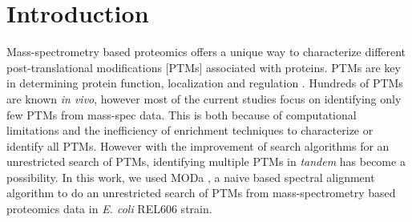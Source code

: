 \documentclass[12pt]{article}
\begin{document}

\section{Introduction}

Mass-spectrometry based proteomics \cite{Lamondetal2012} offers a unique way to characterize different post-translational modifications [PTMs] associated with proteins. PTMs are key in determining protein function, localization and regulation \cite{OlsenMann2013}. Hundreds of PTMs \cite{Garavellietal2001} \cite{CreasyCottrell2004} are known \emph{in vivo}, however most of the current studies focus on identifying only few PTMs from mass-spec data. This is both because of computational limitations and the inefficiency of enrichment techniques to characterize or identify all PTMs. However with the improvement of search algorithms for an unrestricted search of PTMs, identifying multiple PTMs in \emph{tandem} has become a possibility. In this work, we used MODa \cite{Naetal2012}, a naive based spectral alignment algorithm to do an unrestricted search of PTMs from mass-spectrometry based proteomics data in \emph{E. coli} REL606 strain.
\end{document}
